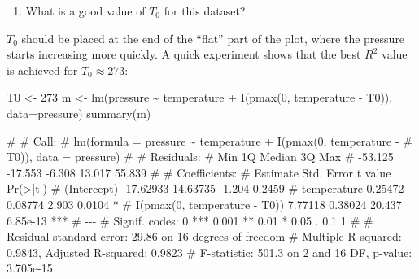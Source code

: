 \documentclass[
  a4paper,
]{article}
\newenvironment{Shaded}{\begin{snugshade}}{\end{snugshade}}
\newcommand{\AttributeTok}[1]{\textcolor[rgb]{0.77,0.63,0.00}{#1}}
\newcommand{\DecValTok}[1]{\textcolor[rgb]{0.00,0.00,0.81}{#1}}
\newcommand{\FunctionTok}[1]{\textcolor[rgb]{0.00,0.00,0.00}{#1}}
\newcommand{\NormalTok}[1]{#1}
\newcommand{\OtherTok}[1]{\textcolor[rgb]{0.56,0.35,0.01}{#1}}
\newcommand{\SpecialCharTok}[1]{\textcolor[rgb]{0.00,0.00,0.00}{#1}}
\providecommand{\tightlist}{%
  \setlength{\itemsep}{0pt}\setlength{\parskip}{0pt}}
\theoremstyle{definition}
\theoremstyle{definition}
\theoremstyle{definition}
\theoremstyle{definition}
\theoremstyle{remark}
\begin{document}
\begin{enumerate}
\def\labelenumi{\alph{enumi}.}
\setcounter{enumi}{2}
\tightlist
\item
  What is a good value of \(T_0\) for this dataset?
\end{enumerate}

\begin{myanswers}
\(T_0\) should be placed at the end of the ``flat'' part
of the plot, where the pressure starts increasing more
quickly. A quick experiment shows that the best \(R^2\)
value is achieved for \(T_0 \approx 273\):

\begin{Shaded}
\begin{Highlighting}[]
\NormalTok{T0 }\OtherTok{\textless{}{-}} \DecValTok{273}
\NormalTok{m }\OtherTok{\textless{}{-}} \FunctionTok{lm}\NormalTok{(pressure }\SpecialCharTok{\textasciitilde{}}\NormalTok{ temperature }\SpecialCharTok{+} \FunctionTok{I}\NormalTok{(}\FunctionTok{pmax}\NormalTok{(}\DecValTok{0}\NormalTok{, temperature }\SpecialCharTok{{-}}\NormalTok{ T0)),}
        \AttributeTok{data=}\NormalTok{pressure)}
\FunctionTok{summary}\NormalTok{(m)}
\end{Highlighting}
\end{Shaded}

\begin{Shaded}
\begin{Highlighting}[]
\NormalTok{\# }
\NormalTok{\# Call:}
\NormalTok{\# lm(formula = pressure \textasciitilde{} temperature + I(pmax(0, temperature {-} }
\NormalTok{\#     T0)), data = pressure)}
\NormalTok{\# }
\NormalTok{\# Residuals:}
\NormalTok{\#     Min      1Q  Median      3Q     Max }
\NormalTok{\# {-}53.125 {-}17.553  {-}6.308  13.017  55.839 }
\NormalTok{\# }
\NormalTok{\# Coefficients:}
\NormalTok{\#                               Estimate Std. Error t value Pr(\textgreater{}|t|)    }
\NormalTok{\# (Intercept)                  {-}17.62933   14.63735  {-}1.204   0.2459    }
\NormalTok{\# temperature                    0.25472    0.08774   2.903   0.0104 *  }
\NormalTok{\# I(pmax(0, temperature {-} T0))   7.77118    0.38024  20.437 6.85e{-}13 ***}
\NormalTok{\# {-}{-}{-}}
\NormalTok{\# Signif. codes:  0 \textquotesingle{}***\textquotesingle{} 0.001 \textquotesingle{}**\textquotesingle{} 0.01 \textquotesingle{}*\textquotesingle{} 0.05 \textquotesingle{}.\textquotesingle{} 0.1 \textquotesingle{} \textquotesingle{} 1}
\NormalTok{\# }
\NormalTok{\# Residual standard error: 29.86 on 16 degrees of freedom}
\NormalTok{\# Multiple R{-}squared:  0.9843,  Adjusted R{-}squared:  0.9823 }
\NormalTok{\# F{-}statistic: 501.3 on 2 and 16 DF,  p{-}value: 3.705e{-}15}
\end{Highlighting}
\end{Shaded}


\end{myanswers}
\end{document}
